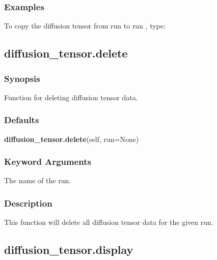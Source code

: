   
 \subsubsection{Examples} 

 To copy the diffusion tensor from run  to run , type: 
  


  

 \newpage 

 \subsection{diffusion\_tensor.delete} 

  
 \subsubsection{Synopsis} 

 Function for deleting diffusion tensor data. 
  

  
 \subsubsection{Defaults} 

 \textsf{\textbf{diffusion\_tensor.delete}(self, run=None)} 

  
 \subsubsection{Keyword Arguments} 

   The name of the run.  

  

  
 \subsubsection{Description} 

 This function will delete all diffusion tensor data for the given run. 
  

  

 \newpage 

 \subsection{diffusion\_tensor.display} 

